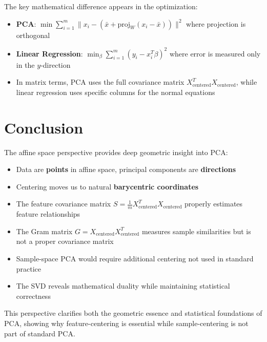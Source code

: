 \begin{notechapter}
\begin{remark}
The key mathematical difference appears in the optimization:
\begin{itemize}
    \item \textbf{PCA}: $\min \sum_{i=1}^m \|x_i - (\bar{x} + \text{proj}_W(x_i - \bar{x}))\|^2$ where projection is orthogonal
    
    \item \textbf{Linear Regression}: $\min_{\beta} \sum_{i=1}^m (y_i - x_i^T\beta)^2$ where error is measured only in the $y$-direction
    
    \item In matrix terms, PCA uses the full covariance matrix $X_{\text{centered}}^T X_{\text{centered}}$, while linear regression uses specific columns for the normal equations
\end{itemize}
\end{remark}

\section{Conclusion}

The affine space perspective provides deep geometric insight into PCA:
\begin{itemize}
    \item Data are \textbf{points} in affine space, principal components are \textbf{directions}
    \item Centering moves us to natural \textbf{barycentric coordinates}
    \item The feature covariance matrix $S = \frac{1}{m}X_{\text{centered}}^T X_{\text{centered}}$ properly estimates feature relationships
    \item The Gram matrix $G = X_{\text{centered}} X_{\text{centered}}^T$ measures sample similarities but is not a proper covariance matrix
    \item Sample-space PCA would require additional centering not used in standard practice
    \item The SVD reveals mathematical duality while maintaining statistical correctness
\end{itemize}

This perspective clarifies both the geometric essence and statistical foundations of PCA, showing why feature-centering is essential while sample-centering is not part of standard PCA.
\end{notechapter}
